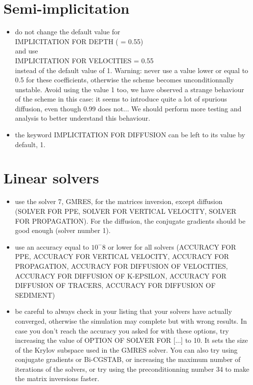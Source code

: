\section{Semi-implicitation}
\begin{itemize}
\item do not change the default value for\\
  IMPLICITATION FOR DEPTH ( = 0.55)\\
  and use \\
  IMPLICITATION FOR VELOCITIES = 0.55 \\
instead of the default value of 1. Warning: never use a value lower or equal to 0.5 for these coefficients,
otherwise the scheme becomes unconditionnally unstable. Avoid using the value 1 too, we have observed a
strange behaviour of the scheme in this case: it seems to introduce quite a lot of spurious diffusion,
even though 0.99 does not... We should perform more testing and analysis to better understand this behaviour.
\item the keyword IMPLICITATION FOR DIFFUSION can be left to its value by default, 1.
\end{itemize}

\section{Linear solvers}
\begin{itemize}
\item use the solver 7, GMRES, for the matrices inversion, except diffusion (SOLVER FOR PPE, SOLVER FOR VERTICAL VELOCITY, SOLVER FOR PROPAGATION). For the diffusion, the conjugate gradients should be good enough (solver number 1).
\item use an accuracy equal to $10^-8$ or lower for all solvers (ACCURACY FOR PPE, ACCURACY FOR VERTICAL VELOCITY, ACCURACY FOR PROPAGATION, ACCURACY FOR DIFFUSION OF VELOCITIES, ACCURACY FOR DIFFUSION OF K-EPSILON, ACCURACY FOR DIFFUSION OF TRACERS, ACCURACY FOR DIFFUSION OF SEDIMENT)
\item be careful to always check in your listing that your solvers have actually converged, otherwise the simulation may complete but with wrong results.
  In case you don't reach the accuracy you asked for with these options, try increasing the value of OPTION OF SOLVER FOR [...] to 10.
  It sets the size of the Krylov subspace used in the GMRES solver. You can also try using conjugate gradients or Bi-CGSTAB, or increasing the maximum number of iterations of the solvers,
  or try using the preconditionning number 34 to make the matrix inversions faster.
\end{itemize}

